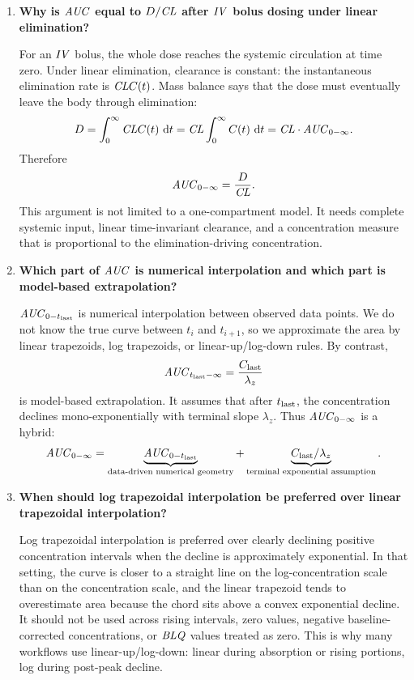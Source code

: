 \documentclass[a4paper]{article}
\newcommand{\CL}{\ensuremath{\pksym{CL}}}
\newcommand{\AUC}{\ensuremath{\pksym{AUC}}}
\newcommand{\AUClast}{\ensuremath{\pksym{AUC}_{0-t_{\pklab{last}}}}}
\newcommand{\AUCinf}{\ensuremath{\pksym{AUC}_{0-\infty}}}
\newcommand{\Clast}{\ensuremath{C_{\pklab{last}}}}
\newcommand{\Tlast}{\ensuremath{t_{\pklab{last}}}}
\newcommand{\lambdaZ}{\ensuremath{\lambda_z}}
\newcommand{\IV}{\ensuremath{\pksym{IV}}}
\newcommand{\BLQ}{\ensuremath{\pksym{BLQ}}}
\begin{document}
\begin{enumerate}[leftmargin=2em]
  \item \textbf{Why is \AUC{} equal to \(D/\CL\) after \IV{} bolus dosing under linear elimination?}

  For an \IV{} bolus, the whole dose reaches the systemic circulation at time zero. Under linear elimination, clearance is constant: the instantaneous elimination rate is \(\CL C(t)\). Mass balance says that the dose must eventually leave the body through elimination:
  \[
    D
    =
    \int_0^\infty \CL C(t)\,\dd t
    =
    \CL\int_0^\infty C(t)\,\dd t
    =
    \CL\cdot\AUCinf.
  \]
  Therefore
  \[
    \AUCinf=\frac{D}{\CL}.
  \]
  This argument is not limited to a one-compartment model. It needs complete systemic input, linear time-invariant clearance, and a concentration measure that is proportional to the elimination-driving concentration.

  \item \textbf{Which part of \AUC{} is numerical interpolation and which part is model-based extrapolation?}

  \(\AUClast\) is numerical interpolation between observed data points. We do not know the true curve between \(t_i\) and \(t_{i+1}\), so we approximate the area by linear trapezoids, log trapezoids, or linear-up/log-down rules. By contrast,
  \[
    \pksym{AUC}_{\Tlast-\infty}=\frac{\Clast}{\lambdaZ}
  \]
  is model-based extrapolation. It assumes that after \(\Tlast\), the concentration declines mono-exponentially with terminal slope \(\lambdaZ\). Thus \(\AUCinf\) is a hybrid:
  \[
    \AUCinf
    =
    \underbrace{\AUClast}_{\text{data-driven numerical geometry}}
    +
    \underbrace{\Clast/\lambdaZ}_{\text{terminal exponential assumption}}.
  \]

  \item \textbf{When should log trapezoidal interpolation be preferred over linear trapezoidal interpolation?}

  Log trapezoidal interpolation is preferred over clearly declining positive concentration intervals when the decline is approximately exponential. In that setting, the curve is closer to a straight line on the log-concentration scale than on the concentration scale, and the linear trapezoid tends to overestimate area because the chord sits above a convex exponential decline. It should not be used across rising intervals, zero values, negative baseline-corrected concentrations, or \BLQ{} values treated as zero. This is why many workflows use linear-up/log-down: linear during absorption or rising portions, log during post-peak decline.


\end{enumerate}
\end{document}
